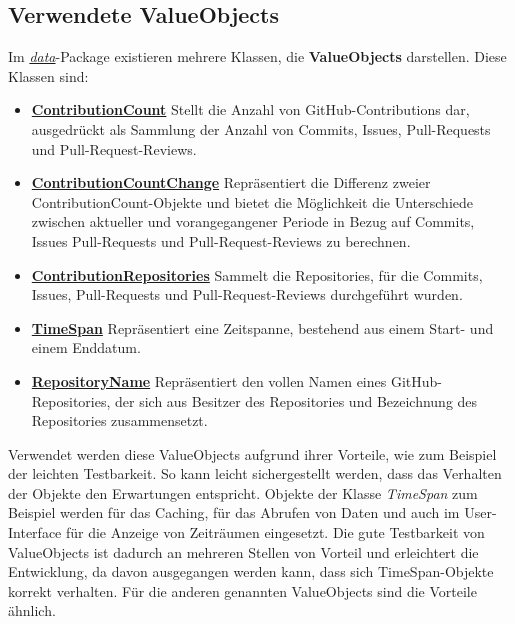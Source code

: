 \documentclass[12pt]{article}
\begin{document}
\subsection{Verwendete ValueObjects}
Im \textit{\href{https://github.com/lukaspanni/OpenSourceStats/tree/main/app/src/main/java/de/lukaspanni/opensourcestats/data}{data}}-Package existieren mehrere Klassen, die \textbf{ValueObjects} darstellen.
\newline
Diese Klassen sind:
\begin{itemize}
\item{\textbf{\href{https://github.com/lukaspanni/OpenSourceStats/blob/main/app/src/main/java/de/lukaspanni/opensourcestats/data/ContributionCount.java}{ContributionCount}}}
\newline
Stellt die Anzahl von GitHub-Contributions dar, ausgedrückt als Sammlung der Anzahl von Commits, Issues, Pull-Requests und Pull-Request-Reviews.
\item{\textbf{\href{https://github.com/lukaspanni/OpenSourceStats/blob/main/app/src/main/java/de/lukaspanni/opensourcestats/data/ContributionCountChange.java}{ContributionCountChange}}}
\newline
Repräsentiert die Differenz zweier ContributionCount-Objekte und bietet die Möglichkeit die Unterschiede zwischen aktueller und vorangegangener Periode in Bezug auf Commits, Issues Pull-Requests und Pull-Request-Reviews zu berechnen. 
\item{\textbf{\href{https://github.com/lukaspanni/OpenSourceStats/blob/main/app/src/main/java/de/lukaspanni/opensourcestats/data/ContributionRepositories.java}{ContributionRepositories}}}
\newline
Sammelt die Repositories, für die Commits, Issues, Pull-Requests und Pull-Request-Reviews durchgeführt wurden.
\item{\textbf{\href{https://github.com/lukaspanni/OpenSourceStats/blob/main/app/src/main/java/de/lukaspanni/opensourcestats/data/TimeSpan.java}{TimeSpan}}}
\newline
Repräsentiert eine Zeitspanne, bestehend aus einem Start- und einem Enddatum.
\item{\textbf{\href{https://github.com/lukaspanni/OpenSourceStats/blob/main/app/src/main/java/de/lukaspanni/opensourcestats/data/RepositoryName.java}{RepositoryName}}}
\newline
Repräsentiert den vollen Namen eines GitHub-Repositories, der sich aus Besitzer des Repositories und Bezeichnung des Repositories zusammensetzt.
\end{itemize}
Verwendet werden diese ValueObjects aufgrund ihrer Vorteile, wie zum Beispiel der leichten Testbarkeit.
So kann leicht sichergestellt werden, dass das Verhalten der Objekte den Erwartungen entspricht.
\newline
Objekte der Klasse \textit{TimeSpan} zum Beispiel werden für das Caching, für das Abrufen von Daten und auch im User-Interface für die Anzeige von Zeiträumen eingesetzt.
Die gute Testbarkeit von ValueObjects ist dadurch an mehreren Stellen von Vorteil und erleichtert die Entwicklung, da davon ausgegangen werden kann, dass sich TimeSpan-Objekte korrekt verhalten.
Für die anderen genannten ValueObjects sind die Vorteile ähnlich.
\end{document}
